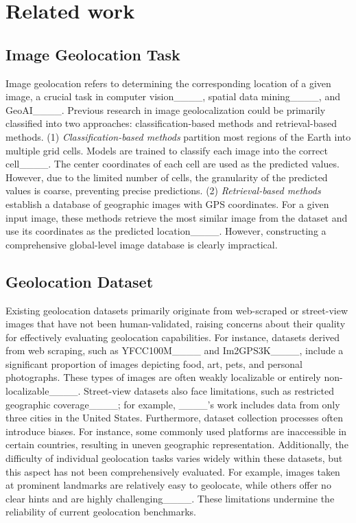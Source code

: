 \section{Related work}
\subsection{Image Geolocation Task}
\label{related1}


Image geolocation refers to determining the corresponding location of a given image, a crucial task in computer vision____, spatial data mining____, and GeoAI____.
Previous research in image geolocalization could be primarily classified into two approaches: classification-based methods and retrieval-based methods.
(1) \textit{Classification-based methods} partition most regions of the Earth into multiple grid cells.
Models are trained to classify each image into the correct cell____. 
The center coordinates of each cell are used as the predicted values. 
However, due to the limited number of cells, the granularity of the predicted values is coarse, preventing precise predictions.
(2) \textit{Retrieval-based methods} establish a database of geographic images with GPS coordinates. 
For a given input image, these methods retrieve the most similar image from the dataset and use its coordinates as the predicted location____. 
However, constructing a comprehensive global-level image database is clearly impractical.




\subsection{Geolocation Dataset}

Existing geolocation datasets primarily originate from web-scraped or street-view images that have not been human-validated, raising concerns about their quality for effectively evaluating geolocation capabilities. 
For instance, datasets derived from web scraping, such as YFCC100M____ and Im2GPS3K____, include a significant proportion of images depicting food, art, pets, and personal photographs. 
These types of images are often weakly localizable or entirely non-localizable____.
Street-view datasets also face limitations, such as restricted geographic coverage____; for example, ____'s work includes data from only three cities in the United States.
Furthermore, dataset collection processes often introduce biases. 
For instance, some commonly used platforms are inaccessible in certain countries, resulting in uneven geographic representation. 
Additionally, the difficulty of individual geolocation tasks varies widely within these datasets, but this aspect has not been comprehensively evaluated. 
For example, images taken at prominent landmarks are relatively easy to geolocate, while others offer no clear hints and are highly challenging____.
These limitations undermine the reliability of current geolocation benchmarks.


